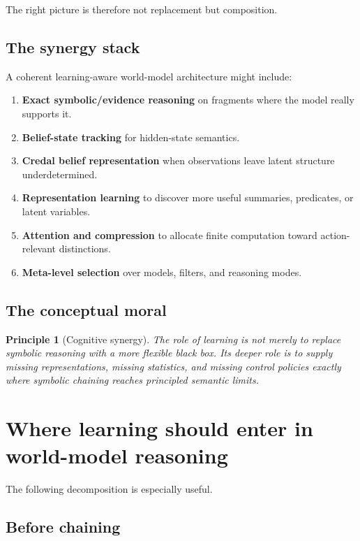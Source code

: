 \documentclass[11pt]{article}
\newtheorem{principle}{Principle}
\begin{document}
The right picture is therefore not replacement but composition.

\subsection{The synergy stack}

A coherent learning-aware world-model architecture might include:
\begin{enumerate}
  \item \textbf{Exact symbolic/evidence reasoning} on fragments where the model
        really supports it.
  \item \textbf{Belief-state tracking} for hidden-state semantics.
  \item \textbf{Credal belief representation} when observations leave latent
        structure underdetermined.
  \item \textbf{Representation learning} to discover more useful summaries,
        predicates, or latent variables.
  \item \textbf{Attention and compression} to allocate finite computation toward
        action-relevant distinctions.
  \item \textbf{Meta-level selection} over models, filters, and reasoning modes.
\end{enumerate}

\subsection{The conceptual moral}

\begin{principle}[Cognitive synergy]
The role of learning is not merely to replace symbolic reasoning with a more
flexible black box.  Its deeper role is to supply missing representations,
missing statistics, and missing control policies exactly where symbolic chaining
reaches principled semantic limits.
\end{principle}

\section{Where learning should enter in world-model reasoning}

The following decomposition is especially useful.

\subsection{Before chaining}
\end{document}
